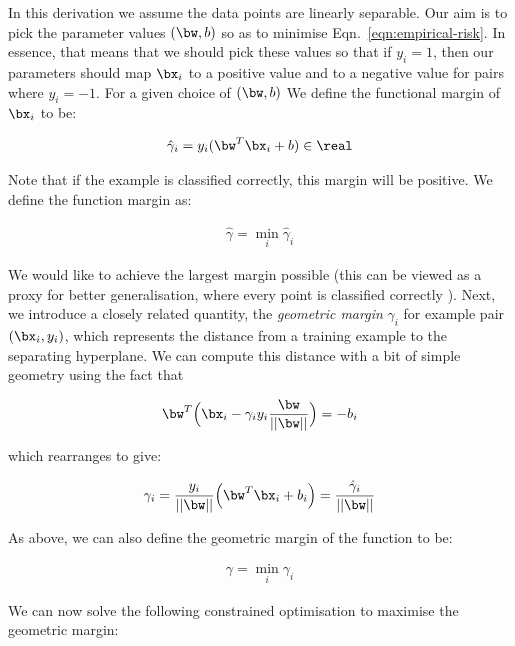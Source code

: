 
In this derivation we assume the data points are linearly separable. Our aim is to pick the parameter values $(\bw, b)$ so as to minimise Eqn.~\ref{eqn:empirical-risk}.  In essence, that means that we should pick these values so that if $y_i = 1$, then our parameters should map $\bx_i$ to a positive value and to a negative value for pairs where $y_i = -1$. For a given choice of $(\bw, b)$ We define the functional margin of $\bx_i$ to be:

\begin{align}
\hat{\gamma}_i = y_i (\bw^T \bx_i + b) \in \real
\end{align}

Note that if the example is classified correctly, this margin will be positive. We define the function margin as:

\begin{align}
\hat{\gamma} = \min_i \hat{\gamma}_i
\end{align}

We would like to achieve the largest margin possible (this can be viewed as a proxy for better generalisation, where every point is classified correctly ).  Next, we introduce a closely related quantity, the \textit{geometric margin} $\gamma_i$ for example pair $(\bx_i, y_i)$, which represents the distance from a training example to the separating hyperplane. We can compute this distance with a bit of simple geometry using the fact that


\begin{align}
\bw^T\Big(\bx_i - \gamma_i y_i \frac{\bw}{ ||\bw ||} \Big) = -b_i
\end{align}

which rearranges to give:

\begin{align}
\gamma_i = \frac{y_i}{|| \bw ||}\Big(\bw^T \bx_i + b_i\Big) = \frac{\hat{\gamma}_i}{||\bw||}
\end{align}

As above, we can also define the geometric margin of the function to be:

\begin{align}
\gamma = \min_i \gamma_i
\end{align}

We can now solve the following constrained optimisation to maximise the geometric margin:

